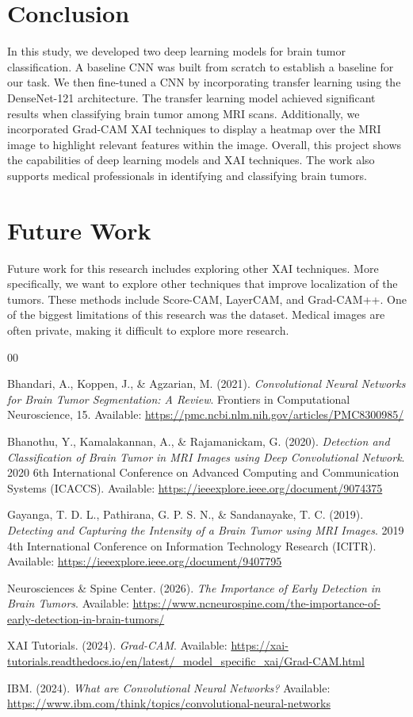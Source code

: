 \documentclass[conference]{IEEEtran}
\begin{document}
\section{Conclusion}
In this study, we developed two deep learning models for brain tumor classification. A baseline CNN was built from scratch to establish a baseline for our task. We then fine-tuned a CNN by incorporating transfer learning using the DenseNet-121 architecture. The transfer learning model achieved significant results when classifying brain tumor among MRI scans. Additionally, we incorporated Grad-CAM XAI techniques to display a heatmap over the MRI image to highlight relevant features within the image. Overall, this project shows the capabilities of deep learning models and XAI techniques. The work also supports medical professionals in identifying and classifying brain tumors.

\section{Future Work}
Future work for this research includes exploring other XAI techniques. More specifically, we want to explore other techniques that improve localization of the tumors. These methods include Score-CAM, LayerCAM, and Grad-CAM++. One of the biggest limitations of this research was the dataset. Medical images are often private, making it difficult to explore more research.
\begin{thebibliography}{00}

Bhandari, A., Koppen, J., \& Agzarian, M. (2021). \emph{Convolutional Neural Networks for Brain Tumor Segmentation: A Review}. 
Frontiers in Computational Neuroscience, 15. 
Available: \url{https://pmc.ncbi.nlm.nih.gov/articles/PMC8300985/}

Bhanothu, Y., Kamalakannan, A., \& Rajamanickam, G. (2020). \emph{Detection and Classification of Brain Tumor in MRI Images using Deep Convolutional Network}. 
2020 6th International Conference on Advanced Computing and Communication Systems (ICACCS). 
Available: \url{https://ieeexplore.ieee.org/document/9074375}

Gayanga, T. D. L., Pathirana, G. P. S. N., \& Sandanayake, T. C. (2019). \emph{Detecting and Capturing the Intensity of a Brain Tumor using MRI Images}. 
2019 4th International Conference on Information Technology Research (ICITR). 
Available: \url{https://ieeexplore.ieee.org/document/9407795}

Neurosciences \& Spine Center. (2026). \emph{The Importance of Early Detection in Brain Tumors}. 
Available: \url{https://www.ncneurospine.com/the-importance-of-early-detection-in-brain-tumors/}


XAI Tutorials. (2024). \emph{Grad-CAM}. 
Available: \url{https://xai-tutorials.readthedocs.io/en/latest/_model_specific_xai/Grad-CAM.html}

IBM. (2024). \emph{What are Convolutional Neural Networks?} 
Available: \url{https://www.ibm.com/think/topics/convolutional-neural-networks}

\end{thebibliography}
\end{document}
